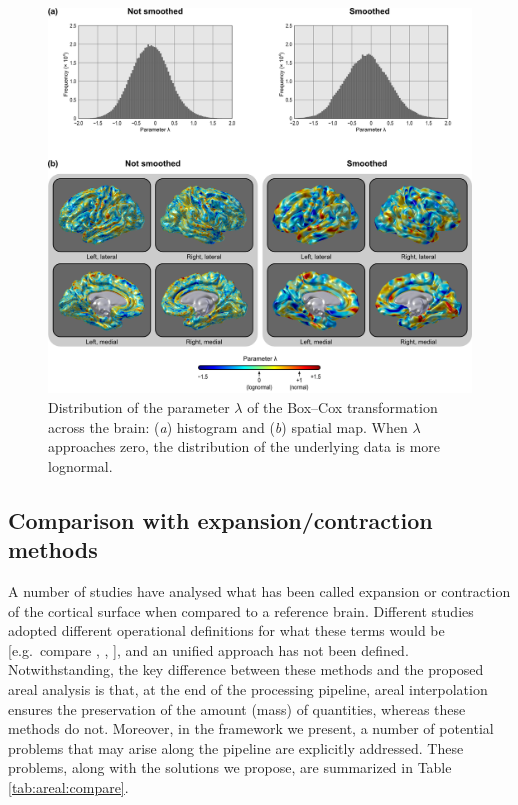 \begin{figure}[!p]  %
\centering
\includegraphics[width=14cm]{images/boxcox.png}
\caption[Spatial distribution of the parameter $\lambda$.]{Distribution of the parameter $\lambda$ of the Box--Cox transformation across the brain: (\emph{a}) histogram and (\emph{b}) spatial map. When $\lambda$ approaches zero, the distribution of the underlying data is more lognormal.}
\label{fig:areal:boxcox}
\end{figure}

\subsection{Comparison with expansion/contraction methods}

A number of studies have analysed what has been called expansion or contraction of the cortical surface when compared to a reference brain. Different studies adopted different operational definitions for what these terms would be [e.g.\ compare \citet{Joyner2009}, \citet{Sun2009}, \citet{Hill2010}], and an unified approach has not been defined. Notwithstanding, the key difference between these methods and the proposed areal analysis is that, at the end of the processing pipeline, areal interpolation ensures the preservation of the amount (mass) of quantities, whereas these methods do not. Moreover, in the framework we present, a number of potential problems that may arise along the pipeline are explicitly addressed. These problems, along with the solutions we propose, are summarized in Table \ref{tab:areal:compare}.

